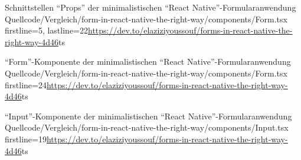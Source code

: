 \begin{fremdeslisting}{}{Schnittstellen \enquote{Props} der minimalistischen \enquote{React Native}-For\-mu\-lar\-an\-wen\-dung}
  {Quellcode/Vergleich/form-in-react-native-the-right-way/components/Form.tsx}
  {firstline=5, lastline=22}{\url{https://dev.to/elaziziyoussouf/forms-in-react-native-the-right-way-4d46}}{ts}

  \label{lst:VergleichReactNatveForm}

\end{fremdeslisting}

\begin{fremdeslisting}{}{\enquote{Form}-Komponente der minimalistischen \enquote{React Native}-For\-mu\-lar\-an\-wen\-dung}
	{Quellcode/Vergleich/form-in-react-native-the-right-way/components/Form.tsx}
	{firstline=24}{\url{https://dev.to/elaziziyoussouf/forms-in-react-native-the-right-way-4d46}}{ts}

	\label{lst:VergleichReactNatveForm2}

\end{fremdeslisting}

\begin{fremdeslisting}{}{\enquote{Input}-Komponente der minimalistischen \enquote{React Native}-For\-mu\-lar\-an\-wen\-dung}
  {Quellcode/Vergleich/form-in-react-native-the-right-way/components/Input.tsx}
  {firstline=19}{\url{https://dev.to/elaziziyoussouf/forms-in-react-native-the-right-way-4d46}}{ts}

  \label{lst:VergleichReactNatveInput}
  
\end{fremdeslisting} 
